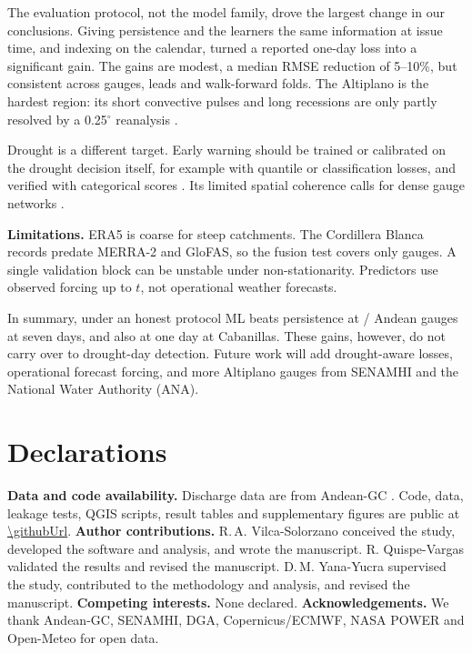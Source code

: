 \documentclass[graybox]{svmult}
\begin{document}
The evaluation protocol, not the model family, drove the largest change in our conclusions. Giving persistence and the learners the same information at issue time, and indexing on the calendar, turned a reported one-day loss into a significant gain. The gains are modest, a median RMSE reduction of 5--10\%, but consistent across gauges, leads and walk-forward folds. The Altiplano is the hardest region: its short convective pulses and long recessions are only partly resolved by a 0.25$^\circ$ reanalysis \cite{garreaud2003altiplano,lujano2025gridded}.

Drought is a different target. Early warning should be trained or calibrated on the drought decision itself, for example with quantile or classification losses, and verified with categorical scores \cite{sutanto2021definitions}. Its limited spatial coherence calls for dense gauge networks \cite{zubieta2021titicaca}.

\textbf{Limitations.} ERA5 is coarse for steep catchments. The Cordillera Blanca records predate MERRA-2 and GloFAS, so the fusion test covers only \nFusion{} gauges. A single validation block can be unstable under non-stationarity. Predictors use observed forcing up to $t$, not operational weather forecasts.

In summary, under an honest protocol ML beats persistence at \nPosSeven{}/\nGauges{} Andean gauges at seven days, and also at one day at Cabanillas. These gains, however, do not carry over to drought-day detection. Future work will add drought-aware losses, operational forecast forcing, and more Altiplano gauges from SENAMHI and the National Water Authority (ANA).

\section*{Declarations}
\noindent\textbf{Data and code availability.} Discharge data are from Andean-GC \cite{aguayo2026andeangc}. Code, data, leakage tests, QGIS scripts, result tables and supplementary figures are public at {\small\url{\githubUrl}}.
\textbf{Author contributions.} R.\,A. Vilca-Solorzano conceived the study, developed the software and analysis, and wrote the manuscript. R. Quispe-Vargas validated the results and revised the manuscript. D.\,M. Yana-Yucra supervised the study, contributed to the methodology and analysis, and revised the manuscript. \textbf{Competing interests.} None declared. \textbf{Acknowledgements.} We thank Andean-GC, SENAMHI, DGA, Copernicus/ECMWF, NASA POWER and Open-Meteo for open data.



\end{document}
